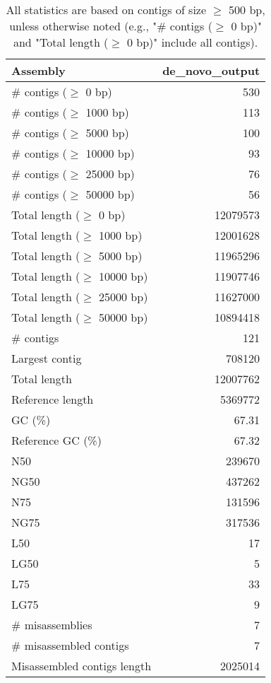 \documentclass[a4paper]{article}
\begin{document}
\begin{table}[ht]
\begin{center}
\caption{All statistics are based on contigs of size $\geq$ 500 bp, unless otherwise noted (e.g., "\# contigs ($\geq$ 0 bp)" and "Total length ($\geq$ 0 bp)" include all contigs).
\label{fig:table1}
}
\begin{tabular}{|l*{1}{|r}|}
\hline
Assembly & de\_novo\_output \\ \hline
\# contigs ($\geq$ 0 bp) & 530 \\ \hline
\# contigs ($\geq$ 1000 bp) & 113 \\ \hline
\# contigs ($\geq$ 5000 bp) & 100 \\ \hline
\# contigs ($\geq$ 10000 bp) & 93 \\ \hline
\# contigs ($\geq$ 25000 bp) & 76 \\ \hline
\# contigs ($\geq$ 50000 bp) & 56 \\ \hline
Total length ($\geq$ 0 bp) & 12079573 \\ \hline
Total length ($\geq$ 1000 bp) & 12001628 \\ \hline
Total length ($\geq$ 5000 bp) & 11965296 \\ \hline
Total length ($\geq$ 10000 bp) & 11907746 \\ \hline
Total length ($\geq$ 25000 bp) & 11627000 \\ \hline
Total length ($\geq$ 50000 bp) & 10894418 \\ \hline
\# contigs & 121 \\ \hline
Largest contig & 708120 \\ \hline
Total length & 12007762 \\ \hline
Reference length & 5369772 \\ \hline
GC (\%) & 67.31 \\ \hline
Reference GC (\%) & 67.32 \\ \hline
N50 & 239670 \\ \hline
NG50 & 437262 \\ \hline
N75 & 131596 \\ \hline
NG75 & 317536 \\ \hline
L50 & 17 \\ \hline
LG50 & 5 \\ \hline
L75 & 33 \\ \hline
LG75 & 9 \\ \hline
\# misassemblies & 7 \\ \hline
\# misassembled contigs & 7 \\ \hline
Misassembled contigs length & 2025014 \\ \hline

\end{tabular}
\end{center}
\end{table}
\end{document}
